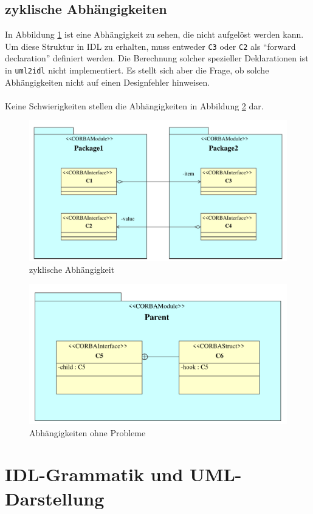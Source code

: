 \documentclass [a4paper,10pt] {scrartcl}
\begin{document}
\subsection{zyklische Abh{\"a}ngigkeiten}
\label{sec:Cycles}
In Abbildung \ref{fig:problem1} ist eine Abh{\"a}ngigkeit zu sehen, die nicht
aufgel{\"o}st werden kann.\\
Um diese Struktur in \textsf{IDL} zu erhalten, muss entweder \texttt{C3} oder
\texttt{C2} als "`forward declaration"' definiert werden.
Die Berechnung solcher spezieller Deklarationen ist in \texttt{uml2idl} nicht implementiert.
Es stellt sich aber die Frage, ob solche Abh{\"a}ngigkeiten nicht auf einen Designfehler hinweisen.\\
~\\
Keine Schwierigkeiten stellen die Abh{\"a}ngigkeiten in Abbildung \ref{fig:noProblem} dar.
\begin{figure}[!h]
\centerline{\includegraphics[width=0.8 \linewidth]{problem1}}
\caption{zyklische Abh{\"a}ngigkeit}
\label{fig:problem1}
\end{figure}
\begin{figure}[!h]
\centerline{\includegraphics[width=0.8 \linewidth]{noProblem}}
\caption{Abh{\"a}ngigkeiten ohne Probleme}
\label{fig:noProblem}
\end{figure}

\cleardoublepage
\section{IDL-Grammatik und UML-Darstellung}
\label{sec:BNF}
\end{document}
